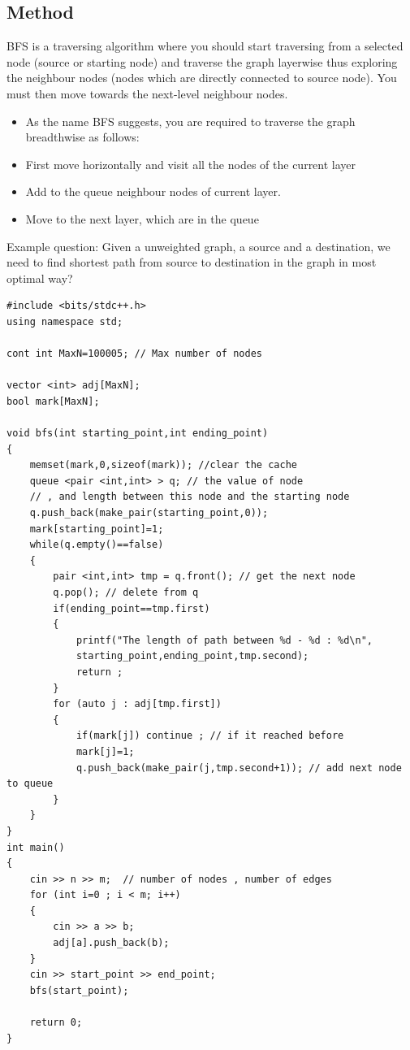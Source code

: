 \documentclass[12pt]{article}
\begin{document}
    \subsection{Method}
BFS is a traversing algorithm where you should start traversing from a selected node (source or starting node) and traverse the graph layerwise thus exploring the neighbour nodes (nodes which are directly connected to source node). You must then move towards the next-level neighbour nodes. \cite{3}

    \begin{itemize}
        

        \item 
        As the name BFS suggests, you are required to traverse the graph breadthwise as follows:
        \item 
        First move horizontally and visit all the nodes of the current layer
        \item 
        Add to the queue neighbour nodes of current layer.
        \item 
        Move to the next layer, which are in the queue     

        \end{itemize}

Example question: Given a unweighted graph, a source and a destination, we need to find shortest path from source to destination in the graph in most optimal way?        
    \begin{verbatim}
#include <bits/stdc++.h>
using namespace std;

cont int MaxN=100005; // Max number of nodes

vector <int> adj[MaxN];
bool mark[MaxN];

void bfs(int starting_point,int ending_point)
{
    memset(mark,0,sizeof(mark)); //clear the cache
    queue <pair <int,int> > q; // the value of node  
    // , and length between this node and the starting node
    q.push_back(make_pair(starting_point,0));
    mark[starting_point]=1;
    while(q.empty()==false)  
    {
        pair <int,int> tmp = q.front(); // get the next node
        q.pop(); // delete from q  
        if(ending_point==tmp.first)
        {
            printf("The length of path between %d - %d : %d\n",
            starting_point,ending_point,tmp.second);
            return ;
        }
        for (auto j : adj[tmp.first])
        {
            if(mark[j]) continue ; // if it reached before
            mark[j]=1;
            q.push_back(make_pair(j,tmp.second+1)); // add next node to queue 
        }
    }
}
int main() 
{ 
    cin >> n >> m;  // number of nodes , number of edges
    for (int i=0 ; i < m; i++)
    {
        cin >> a >> b;
        adj[a].push_back(b);
    }
    cin >> start_point >> end_point;
    bfs(start_point);

    return 0; 
}
 
\end{verbatim}
\end{document}
